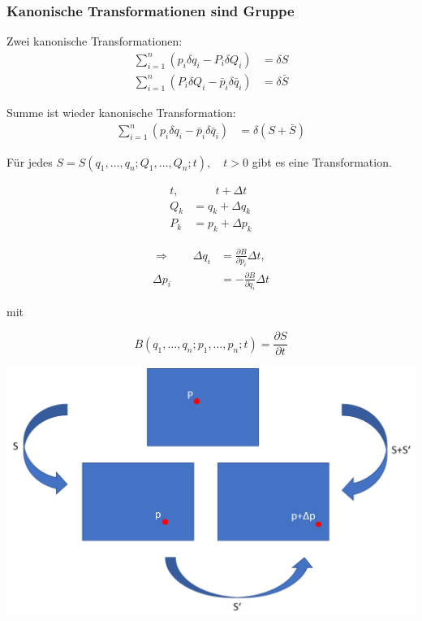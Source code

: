 \begin{frame}
    \frametitle{Kanonische Transformationen sind Gruppe}
    
    Zwei kanonische Transformationen:
    \begin{align*}
        \sum_{i=1}^{n} (p_i \delta q_i - P_i \delta Q_i) &= \delta S \\
        \sum_{i=1}^{n} (P_i \delta Q_i - \bar{p}_i \delta \bar{q}_i) &= \delta \bar{S}
    \end{align*}
    
    Summe ist wieder kanonische Transformation:
        \begin{align*}
        \sum_{i=1}^{n} (p_i \delta q_i - \bar{p}_i \delta \bar{q}_i) &= \delta (S + \bar{S}) 
        \end{align*}
        
    Für jedes $S=S(q_1,\ldots,q_n; Q_1,\ldots,Q_n;t),\quad t>0$ gibt es eine Transformation.
    
\end{frame}


\begin{frame}
    \begin{align*}
        t,&\qquad t+\Delta t \\
        Q_k &= q_k + \Delta q_k \\
        P_k &= p_k + \Delta p_k
    \end{align*}
    
    \begin{align*}
        \Longrightarrow \qquad \Delta q_i &= \frac{\partial B}{\partial p_i} \Delta t,\\
                         \Delta p_i &= -\frac{\partial B}{\partial q_i} \Delta t
    \end{align*}
    
    mit
    
    \begin{displaymath}
        B(q_1,\ldots,q_n; p_1,\ldots,p_n;t) = \frac{\partial S}{\partial t}
    \end{displaymath}
\end{frame}

\begin{frame}
\hspace*{-2.2cm}\includegraphics[scale=0.375]{images/ImagTrans}
\end{frame}

